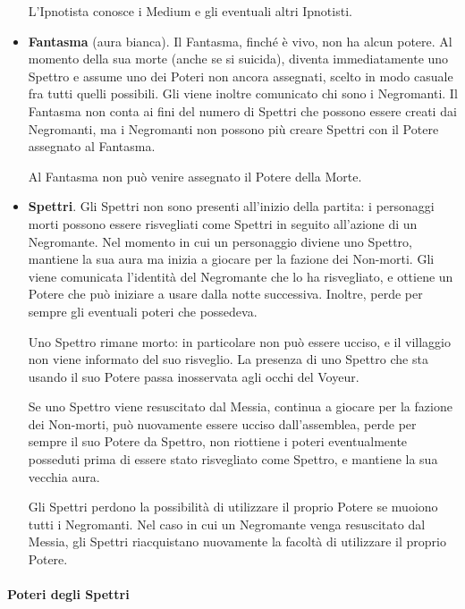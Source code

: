\documentclass[a4paper,10pt]{article}
\begin{document}
\begin{itemize}
 L'Ipnotista conosce i Medium e gli eventuali altri Ipnotisti.

 \item {\bf Fantasma} (aura bianca). Il Fantasma, finché è vivo, non ha alcun potere. Al momento della sua morte (anche se si suicida), diventa immediatamente uno Spettro e assume uno dei Poteri non ancora assegnati, scelto in modo casuale fra tutti quelli possibili. Gli viene inoltre comunicato chi sono i Negromanti. Il Fantasma non conta ai fini del numero di Spettri che possono essere creati dai Negromanti, ma i Negromanti non possono più creare Spettri con il Potere assegnato al Fantasma.
 
 Al Fantasma non può venire assegnato il Potere della Morte.
 
 \item {\bf Spettri}. Gli Spettri non sono presenti all'inizio della partita: i personaggi morti possono essere risvegliati come Spettri in seguito all'azione di un Negromante.
 Nel momento in cui un personaggio diviene uno Spettro, mantiene la sua aura ma inizia a giocare per la fazione dei Non-morti. Gli viene comunicata l'identità del Negromante che lo ha risvegliato, e ottiene un Potere che può iniziare a usare dalla notte successiva. Inoltre, perde per sempre gli eventuali poteri che possedeva.
 
 Uno Spettro rimane morto: in particolare non può essere ucciso, e il villaggio non viene informato del suo risveglio.
 La presenza di uno Spettro che sta usando il suo Potere passa inosservata agli occhi del Voyeur.
 
 Se uno Spettro viene resuscitato dal Messia, continua a giocare per la fazione dei Non-morti, può nuovamente essere ucciso dall'assemblea, perde per sempre il suo Potere da Spettro, non riottiene i poteri eventualmente posseduti prima di essere stato risvegliato come Spettro, e mantiene la sua vecchia aura.
 
 Gli Spettri perdono la possibilità di utilizzare il proprio Potere se muoiono tutti i Negromanti. Nel caso in cui un Negromante venga resuscitato dal Messia, gli Spettri riacquistano nuovamente la facoltà di utilizzare il proprio Potere.
\end{itemize}


\paragraph{Poteri degli Spettri}
\end{document}
